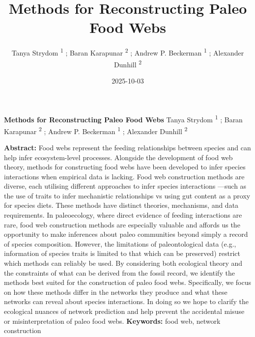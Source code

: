 \documentclass[
]{article}
\title{Methods for Reconstructing Paleo Food Webs}
\author{Tanya Strydom %
%
\textsuperscript{%
%
1%
}%
; Baran Karapunar %
%
\textsuperscript{%
%
2%
}%
; Andrew P. Beckerman %
%
\textsuperscript{%
%
1%
}%
; Alexander Dunhill %
%
\textsuperscript{%
%
2%
}%
}
\date{2025-10-03}
\begin{document}
\thispagestyle{empty}
{\bfseries\sffamily\Large Methods for Reconstructing Paleo Food Webs}
\vfil
Tanya Strydom %
%
\textsuperscript{%
%
1%
}%
; Baran Karapunar %
%
\textsuperscript{%
%
2%
}%
; Andrew P. Beckerman %
%
\textsuperscript{%
%
1%
}%
; Alexander Dunhill %
%
\textsuperscript{%
%
2%
}%

\vfil
{\small
\textbf{Abstract:} Food webs represent the feeding relationships between
species and can help infer ecosystem-level processes. Alongside the
development of food web theory, methods for constructing food webs have
been developed to infer species interactions when empirical data is
lacking. Food web construction methods are diverse, each utilising
different approaches to infer species interactions ---such as the use of
traits to infer mechanistic relationships vs using gut content as a
proxy for species diets. These methods have distinct theories,
mechanisms, and data requirements. In paleoecology, where direct
evidence of feeding interactions are rare, food web construction methods
are especially valuable and affords us the opportunity to make
inferences about paleo communities beyond simply a record of species
composition. However, the limitations of paleontological data (e.g.,
information of species traits is limited to that which can be preserved)
restrict which methods can reliably be used. By considering both
ecological theory and the constraints of what can be derived from the
fossil record, we identify the methods best suited for the construction
of paleo food webs. Specifically, we focus on how these methods differ
in the networks they produce and what these networks can reveal about
species interactions. In doing so we hope to clarify the ecological
nuances of network prediction and help prevent the accidental misuse or
misinterpretation of paleo food webs.
\vfil
\textbf{Keywords:} %
food web, %
network construction%
}
\clearpage
\setcounter{page}{1}
\doublespacing
\linenumbers
\end{document}
